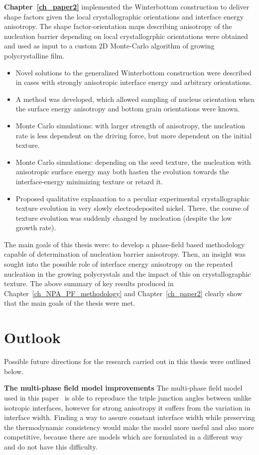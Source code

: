 \textbf{Chapter~\ref{ch_paper2}} implemented the Winterbottom construction to deliver shape factors given the local crystallographic orientations and interface energy anisotropy. The shape factor-orientation maps describing anisotropy of the nucleation barrier depending on local crystallogrphic orientations were obtained and used as input to a custom 2D Monte-Carlo algorithm of growing polycrystalline film.
\begin{itemize}
	\item Novel solutions to the generalized Winterbottom construction were described in cases with strongly anisotropic interface energy and arbitrary orientations.
	\item A method was developed, which allowed sampling of nucleus orientation when the surface energy anisotropy and bottom grain orientations were known.
	\item Monte Carlo simulations: with larger strength of anisotropy, the nucleation rate is less dependent on the driving force, but more dependent on the initial texture.
	\item Monte Carlo simulations: depending on the seed texture, the nucleation with anisotropic surface energy may both hasten the evolution towards the interface-energy minimizing texture or retard it.
	\item Proposed qualitative explanation to a peculiar experimental crystallographic texture evolution in very slowly electrodeposited nickel. There, the course of texture evolution was suddenly changed by nucleation (despite the low growth rate).
\end{itemize}

The main goals of this thesis were: to develop a phase-field based methodology capable of determination of nucleation barrier anisotropy. Then, an insight was sought into the possible role of interface energy anisotropy on the repeated nucleation in the growing polycrystals and the impact of this on crystallographic texture. The above summary of key results produced in Chapter~\ref{ch_NPA_PF_methodology} and Chapter~\ref{ch_paper2} clearly show that the main goals of the thesis were met.
	
\section{Outlook}
Possible future directions for the research carried out in this thesis were outlined below.

\textbf{The multi-phase field model improvements} The multi-phase field model used in this paper~\cite{Moelans2008, Minar2022} is able to reproduce the triple junction angles between unlike isotropic interfaces, however for strong anisotropy it suffers from the variation in interface width. Finding a way to assure constant interface width while preserving the thermodynamic consistency would make the model more useful and also more competitive, because there are models which are formulated in a different way and do not have this difficulty.

